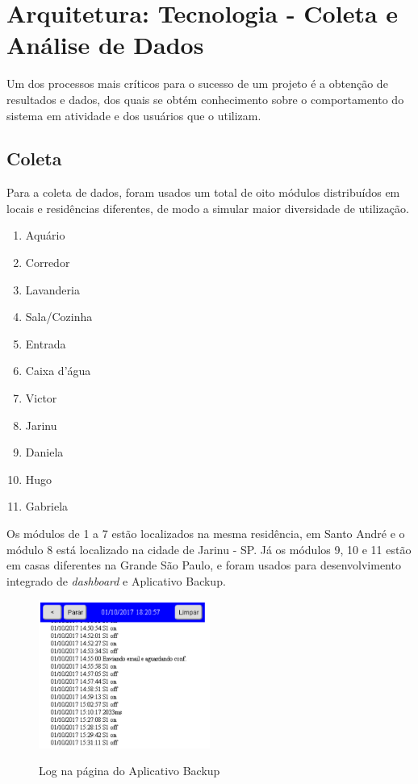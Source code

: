 \chapter{Arquitetura: Tecnologia - Coleta e Análise de Dados \label{coletaAnaliseDados}}

Um dos processos mais críticos para o sucesso de um projeto é a obtenção de resultados e dados, dos quais se obtém conhecimento sobre o comportamento do sistema em atividade e dos usuários que o utilizam.

\section{Coleta}

Para a coleta de dados, foram usados um total de oito módulos distribuídos em locais e residências diferentes, de modo a simular maior diversidade de utilização.

\begin{enumerate}
	\item Aquário
	\item Corredor
	\item Lavanderia
	\item Sala/Cozinha
	\item Entrada
	\item Caixa d’água
	\item Victor
	\item Jarinu
	\item Daniela
	\item Hugo
	\item Gabriela
\end{enumerate}

Os módulos de 1 a 7 estão localizados na mesma residência, em Santo André e o módulo 8 está localizado na cidade de Jarinu - SP. Já os módulos 9, 10 e 11 estão em casas diferentes na Grande São Paulo, e foram usados para desenvolvimento integrado de \textit{dashboard} e Aplicativo Backup.

\begin{figure}[H]
	\centering
	\caption{Log na página do Aplicativo Backup}
	\includegraphics[width=0.5\textwidth]{logAppBackup}
	\label{fig:logAppBackup}
\end{figure}

